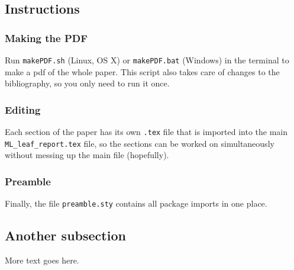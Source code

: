 \subsection{Instructions}
\subsubsection{Making the PDF}
Run \verb+makePDF.sh+ (Linux, OS X) or \verb+makePDF.bat+ (Windows) in the terminal to make a pdf of the whole paper.
This script also takes care of changes to the bibliography, so you only need to run it once.

\subsubsection{Editing}
Each section of the paper has its own \verb+.tex+ file that is imported into the main \verb+ML_leaf_report.tex+ file, so the sections can be worked on simultaneously without messing up the main file (hopefully).

\subsubsection{Preamble}
Finally, the file \verb+preamble.sty+ contains all package imports in one place.

\subsection{Another subsection}
More text goes here.
